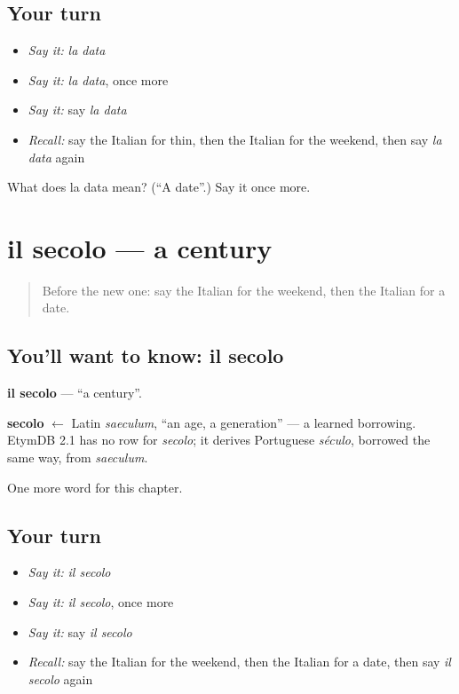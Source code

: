 \subsection*{Your turn}
\begin{itemize}
\raggedright
  \item \emph{Say it:} \emph{la data}
  \item \emph{Say it:} \emph{la data}, once more
  \item \emph{Say it:} say \emph{la data}
  \item \emph{Recall:} say the Italian for thin, then the Italian for the weekend, then say \emph{la data} again
\end{itemize}

\begin{tcolorbox}[breakable,colback=teal!4,colframe=teal!35!black,title={Before you move on}]
What does la data mean? (\textquotedblleft{}A date\textquotedblright{}.) Say it once more.
\end{tcolorbox}
\section[il secolo]{il secolo — a century}

\label{lesson:IT-C131-secolo}



\begin{quote}
Before the new one: say the Italian for the weekend, then the Italian for a date.
\end{quote}

\subsection*{You'll want to know: il secolo}
\textbf{il secolo} — \textquotedblleft{}a century\textquotedblright{}.

\begin{cousinweb}
\textbf{secolo} $\leftarrow$ Latin \emph{saeculum}, \textquotedblleft{}an age, a generation\textquotedblright{} — a learned borrowing. EtymDB 2.1 has no row for \emph{secolo}; it derives Portuguese \emph{século}, borrowed the same way, from \emph{saeculum}.
\end{cousinweb}

\begin{grammarlens}[title={What you've built}]
One more word for this chapter.
\end{grammarlens}

\subsection*{Your turn}
\begin{itemize}
\raggedright
  \item \emph{Say it:} \emph{il secolo}
  \item \emph{Say it:} \emph{il secolo}, once more
  \item \emph{Say it:} say \emph{il secolo}
  \item \emph{Recall:} say the Italian for the weekend, then the Italian for a date, then say \emph{il secolo} again
\end{itemize}

